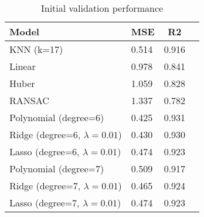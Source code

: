 \begin{table}
\centering
\caption{Initial validation performance}
\label{tab:validation}
\begin{tabular}{|l|l|c|c|}
\toprule
                           Model &   MSE &    R2 \\
\midrule
                      KNN (k=17) & 0.514 & 0.916 \\
                          Linear & 0.978 & 0.841 \\
                           Huber & 1.059 & 0.828 \\
                          RANSAC & 1.337 & 0.782 \\
           Polynomial (degree=6) & 0.425 & 0.931 \\
Ridge (degree=6, $\lambda=0.01$) & 0.430 & 0.930 \\
Lasso (degree=6, $\lambda=0.01$) & 0.474 & 0.923 \\
           Polynomial (degree=7) & 0.509 & 0.917 \\
Ridge (degree=7, $\lambda=0.01$) & 0.465 & 0.924 \\
Lasso (degree=7, $\lambda=0.01$) & 0.474 & 0.923 \\
\bottomrule
\end{tabular}
\end{table}
